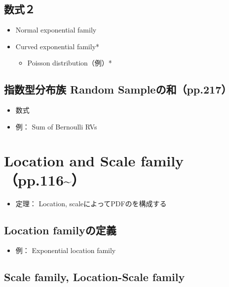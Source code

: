 \documentclass[
]{book}
\providecommand{\tightlist}{%
  \setlength{\itemsep}{0pt}\setlength{\parskip}{0pt}}
\begin{document}
\subsection{数式２}\label{ux6570ux5f0fuxff12}

\begin{itemize}
\tightlist
\item
  Normal exponential family
\item
  Curved exponential family*

  \begin{itemize}
  \tightlist
  \item
    Poisson distribution（例）*
  \end{itemize}
\end{itemize}

\subsection{指数型分布族 Random Sampleの和（pp.217）}\label{ux6307ux6570ux578bux5206ux5e03ux65cf-random-sampleux306eux548cpp.217}

\begin{itemize}
\tightlist
\item
  数式
\item
  例： Sum of Bernoulli RVs
\end{itemize}

\section{Location and Scale family（pp.116\textasciitilde）}\label{location-and-scale-familypp.116}

\begin{itemize}
\tightlist
\item
  定理： Location, scaleによってPDFのを構成する
\end{itemize}

\subsection{Location familyの定義}\label{location-familyux306eux5b9aux7fa9}

\begin{itemize}
\tightlist
\item
  例： Exponential location family
\end{itemize}

\subsection{Scale family, Location-Scale family}\label{scale-family-location-scale-family}
\end{document}
